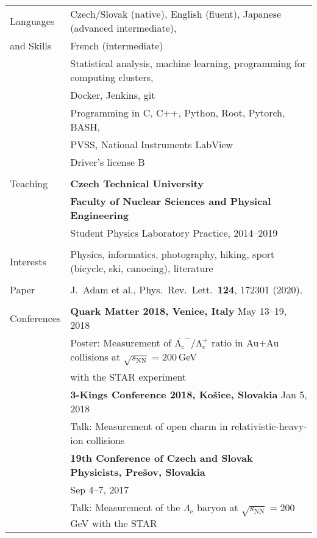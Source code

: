 \documentclass[a4paper,11pt,oneside]{article}
\begin{document}
\newpage

\noindent  \begin{tabular}{@{} l l}
  \Large{Languages}   & Czech/Slovak (native), English (fluent), Japanese (advanced intermediate), \\
\Large{and Skills}    & French (intermediate)  \\[.2cm]
     & Statistical analysis, machine learning, programming for computing clusters, \\
     & Docker, Jenkins, git\\[.2cm]
     & Programming in C, C++, Python, Root, Pytorch, BASH,  \\
     & PVSS, National Instruments LabView \\[.2cm]
     & Driver's license B\\
     \\
  \Large{Teaching}  & \textbf{Czech Technical University} \\
     & \textbf{Faculty of Nuclear Sciences and Physical Engineering} \\
     & Student Physics Laboratory Practice, 2014--2019\\
     \\
\Large{Interests}    
     & Physics, informatics, photography, hiking, sport (bicycle, ski, canoeing), literature \\
     \\
\Large{Paper}
     & J.\ Adam et al., Phys.\ Rev.\ Lett.\ \textbf{124}, 172301 (2020). \\
     \\
\Large{Conferences}
     & \textbf{Quark Matter 2018, Venice, Italy} May 13--19, 2018 \\
     & Poster: Measurement of $\mathrm{\overline{\Lambda_c}^-/\Lambda_c^+}$ ratio in Au+Au collisions at $\sqrt{s_\mathrm{NN}} = 200\,$GeV\\
     &with the STAR experiment \\[.2cm]
     & \textbf{3-Kings Conference 2018, Košice, Slovakia} Jan 5, 2018 \\
     & Talk: Measurement of open charm in relativistic-heavy-ion collisions \\[.2cm]
     & \textbf{19th Conference of Czech and Slovak Physicists, Prešov, Slovakia}\\
     & Sep 4--7, 2017 \\
     & Talk: Measurement of the $\Lambda_\mathrm{c}$ baryon at $\sqrt{s_\mathrm{NN}} = 200\,$GeV with the STAR \\

\end{tabular}
\end{document}
